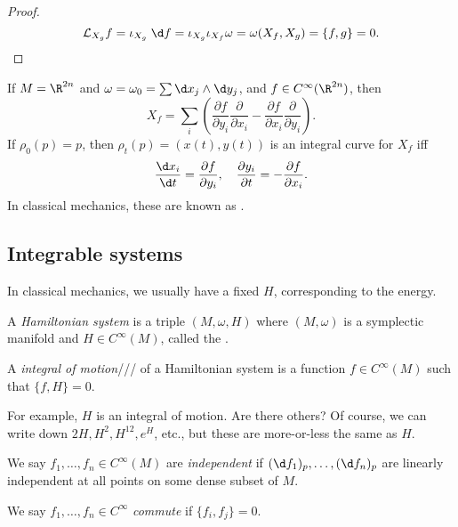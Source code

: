 \documentclass[a4paper]{article}
\begin{document}
\begin{proof}
  \[
    \mathcal{L}_{X_g} f = \iota_{X_g}\;\d f = \iota_{X_g} \iota_{X_f} \omega = \omega(X_f, X_g) = \{f, g\} = 0.\qedhere
  \]
\end{proof}

\begin{eg}
  If $M = \R^{2n}$ and $\omega = \omega_0 = \sum \d x_j \wedge \d y_j$, and $f \in C^\infty(\R^{2n})$, then
  \[
    X_f = \sum_i \left(\frac{\partial f}{\partial y_i} \frac{\partial}{\partial x_i} - \frac{\partial f}{\partial x_i} \frac{\partial }{\partial y_i}\right).
  \]
  If $\rho_0(p) = p$, then $\rho_t(p) = (x(t), y(t))$ is an integral curve for $X_f$ iff
  \[
    \frac{\d x_i}{\d t} = \frac{\partial f}{\partial y_i},\quad \frac{\partial y_i}{\partial t} = -\frac{\partial f}{\partial x_i}.
  \]
  In classical mechanics, these are known as .
\end{eg}

\subsection{Integrable systems}
In classical mechanics, we usually have a fixed $H$, corresponding to the energy.
\begin{defi}
  A \emph{Hamiltonian system} is a triple $(M, \omega, H)$ where $(M, \omega)$ is a symplectic manifold and $H \in C^\infty(M)$, called the .
\end{defi}

\begin{defi}
  A \emph{integral of motion}/// of a Hamiltonian system is a function $f \in C^\infty(M)$ such that $\{f, H\} = 0$.
\end{defi}
For example, $H$ is an integral of motion. Are there others? Of course, we can write down $2H, H^2, H^{12}, e^H$, etc., but these are more-or-less the same as $H$.
\begin{defi}
  We say $f_1, \ldots, f_n \in C^\infty(M)$ are \emph{independent} if $(\d f_1)_p, \ldots, (\d f_n)_p$ are linearly independent at all points on some dense subset of $M$.
\end{defi}

\begin{defi}
  We say $f_1, \ldots, f_n \in C^\infty$ \emph{commute} if $\{f_i, f_j\} = 0$.
\end{defi}
\end{document}
